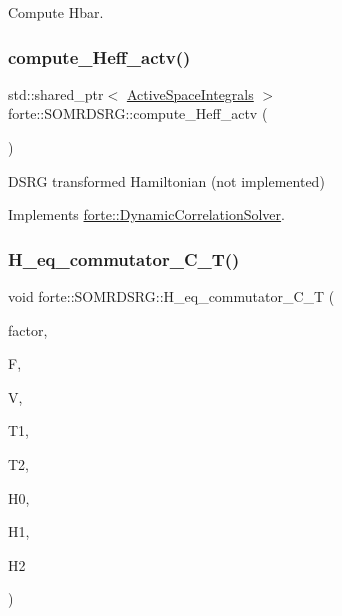 Compute Hbar. 

\mbox{\label{classforte_1_1_s_o_m_r_d_s_r_g_a124b4ab351075d25eec777872e3322f5}} 
\subsubsection{\texorpdfstring{compute\+\_\+\+Heff\+\_\+actv()}{compute\_Heff\_actv()}}
{\footnotesize\ttfamily std\+::shared\+\_\+ptr$<$ \mbox{\hyperlink{classforte_1_1_active_space_integrals}{Active\+Space\+Integrals}} $>$ forte\+::\+S\+O\+M\+R\+D\+S\+R\+G\+::compute\+\_\+\+Heff\+\_\+actv (\begin{DoxyParamCaption}{ }\end{DoxyParamCaption})\hspace{0.3cm}{\ttfamily [virtual]}}



D\+S\+RG transformed Hamiltonian (not implemented) 



Implements \mbox{\hyperlink{classforte_1_1_dynamic_correlation_solver_a8a66ab912dd2c7c1d35c1428df5a494d}{forte\+::\+Dynamic\+Correlation\+Solver}}.

\mbox{\label{classforte_1_1_s_o_m_r_d_s_r_g_a6d10dbf7735e9659a238f4d7d8900330}} 
\subsubsection{\texorpdfstring{H\+\_\+eq\+\_\+commutator\+\_\+\+C\+\_\+\+T()}{H\_eq\_commutator\_C\_T()}}
{\footnotesize\ttfamily void forte\+::\+S\+O\+M\+R\+D\+S\+R\+G\+::\+H\+\_\+eq\+\_\+commutator\+\_\+\+C\+\_\+T (\begin{DoxyParamCaption}\item[{double}]{factor,  }\item[{ambit\+::\+Blocked\+Tensor \&}]{F,  }\item[{ambit\+::\+Blocked\+Tensor \&}]{V,  }\item[{ambit\+::\+Blocked\+Tensor \&}]{T1,  }\item[{ambit\+::\+Blocked\+Tensor \&}]{T2,  }\item[{double \&}]{H0,  }\item[{ambit\+::\+Blocked\+Tensor \&}]{H1,  }\item[{ambit\+::\+Blocked\+Tensor \&}]{H2 }\end{DoxyParamCaption})\hspace{0.3cm}{\ttfamily [protected]}}



